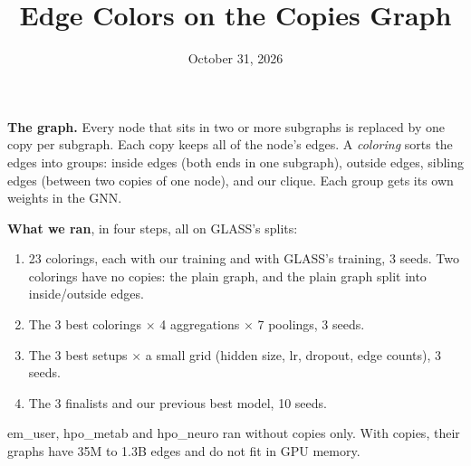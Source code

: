 \documentclass[11pt]{article}
\title{Edge Colors on the Copies Graph}
\author{}
\date{October 31, 2026}
\begin{document}
\maketitle

\textbf{The graph.} Every node that sits in two or more subgraphs is replaced by one copy per
subgraph. Each copy keeps all of the node's edges. A \emph{coloring} sorts the edges into groups:
inside edges (both ends in one subgraph), outside edges, sibling edges (between two copies of one
node), and our clique. Each group gets its own weights in the GNN.

\textbf{What we ran}, in four steps, all on GLASS's splits:
\begin{enumerate}
  \item 23 colorings, each with our training and with GLASS's training, 3 seeds. Two colorings
        have no copies: the plain graph, and the plain graph split into inside/outside edges.
  \item The 3 best colorings $\times$ 4 aggregations $\times$ 7 poolings, 3 seeds.
  \item The 3 best setups $\times$ a small grid (hidden size, lr, dropout, edge counts), 3 seeds.
  \item The 3 finalists and our previous best model, 10 seeds.
\end{enumerate}
em\_user, hpo\_metab and hpo\_neuro ran without copies only. With copies, their graphs have 35M to
1.3B edges and do not fit in GPU memory.
\end{document}

